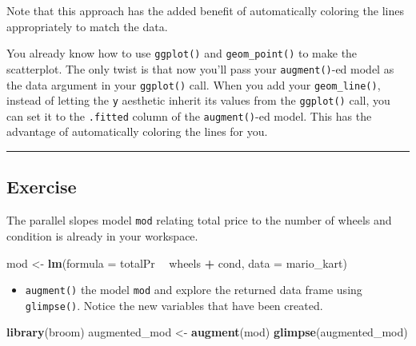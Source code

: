\documentclass[]{book}
\newenvironment{Shaded}{\begin{snugshade}}{\end{snugshade}}
\newcommand{\KeywordTok}[1]{\textcolor[rgb]{0.13,0.29,0.53}{\textbf{#1}}}
\newcommand{\DataTypeTok}[1]{\textcolor[rgb]{0.13,0.29,0.53}{#1}}
\newcommand{\StringTok}[1]{\textcolor[rgb]{0.31,0.60,0.02}{#1}}
\newcommand{\OperatorTok}[1]{\textcolor[rgb]{0.81,0.36,0.00}{\textbf{#1}}}
\newcommand{\NormalTok}[1]{#1}
\providecommand{\tightlist}{%
  \setlength{\itemsep}{0pt}\setlength{\parskip}{0pt}}
\begin{document}
Note that this approach has the added benefit of automatically coloring
the lines appropriately to match the data.

You already know how to use \texttt{ggplot()} and \texttt{geom\_point()}
to make the scatterplot. The only twist is that now you'll pass your
\texttt{augment()}-ed model as the data argument in your
\texttt{ggplot()} call. When you add your \texttt{geom\_line()}, instead
of letting the \texttt{y} aesthetic inherit its values from the
\texttt{ggplot()} call, you can set it to the \texttt{.fitted} column of
the \texttt{augment()}-ed model. This has the advantage of automatically
coloring the lines for you.

\begin{center}\rule{0.5\linewidth}{\linethickness}\end{center}

\subsection*{Exercise}\label{exercise-1}

The parallel slopes model \texttt{mod} relating total price to the
number of wheels and condition is already in your workspace.

\begin{Shaded}
\begin{Highlighting}[]
\NormalTok{mod <-}\StringTok{ }\KeywordTok{lm}\NormalTok{(}\DataTypeTok{formula =}\NormalTok{ totalPr }\OperatorTok{~}\StringTok{ }\NormalTok{wheels }\OperatorTok{+}\StringTok{ }\NormalTok{cond, }\DataTypeTok{data =}\NormalTok{ mario_kart)}
\end{Highlighting}
\end{Shaded}

\begin{itemize}
\tightlist
\item
  \texttt{augment()} the model \texttt{mod} and explore the returned
  data frame using \texttt{glimpse()}. Notice the new variables that
  have been created.
\end{itemize}

\begin{Shaded}
\begin{Highlighting}[]
\KeywordTok{library}\NormalTok{(broom)}
\NormalTok{augmented_mod <-}\StringTok{ }\KeywordTok{augment}\NormalTok{(mod)}
\KeywordTok{glimpse}\NormalTok{(augmented_mod)}
\end{Highlighting}
\end{Shaded}
\end{document}
